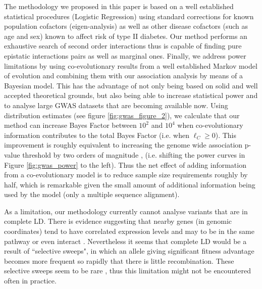 The methodology we proposed in this paper is based on a well established statistical procedures (Logistic Regression) using standard corrections for known population cofactors (eigen-analysis) as well as other disease cofactors (such as age and sex) known to affect risk of type II diabetes.
Our method performs an exhaustive search of second order interactions thus is capable of finding pure epistatic interactions pairs as well as marginal ones.
Finally, we address power limitations by using co-evolutionary results from a well established Markov model of evolution and combining them with our association analysis by means of a Bayesian model.
This has the advantage of not only being based on solid and well accepted theoretical grounds, but also being able to increase statistical power and to analyse large GWAS datasets that are becoming available now.
%
Using distribution estimates (see figure \ref{fig:gwas_figure_2}), we calculate that our method can increase Bayes Factor between $10^2$ and $10^4$ when co-evolutionary information contributes to the total Bayes Factor (i.e. when $\ell_C \ge 0$).
This improvement is roughly equivalent to increasing the genome wide association p-value threshold by two orders of magnitude \cite{goodman1999toward}, (i.e. shifting the power curves in Figure \ref{fig:gwas_power} to the left).
Thus the net effect of adding information from a co-evolutionary model is to reduce sample size requirements roughly by half, which is remarkable given the small amount of additional information being used by the model (only a multiple sequence alignment).

As a limitation, our methodology currently cannot analyse variants that are in complete LD.
There is evidence suggesting that nearby genes (in genomic coordinates) tend to have correlated expression levels and may to be in the same pathway or even interact \cite{petkov2005evidence}.
Nevertheless it seems that complete LD would be a result of ``selective sweeps", in which an allele giving significant fitness advantage becomes more frequent so rapidly that there is little recombination.
These selective sweeps seem to be rare \cite{hernandez2011classic}, thus this limitation might not be encountered often in practice.

